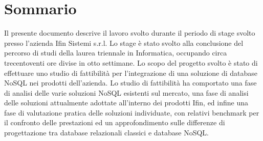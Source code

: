 
\cleardoublepage
{}
{}
\begingroup
\let\clearpage\relax
\let\cleardoublepage\relax
\let\cleardoublepage\relax

\chapter*{Sommario}

Il presente documento descrive il lavoro svolto durante il periodo di stage svolto presso l'azienda Ifin Sistemi s.r.l. Lo stage è stato svolto alla conclusione del percorso di studi della laurea triennale in Informatica, occupando circa trecentoventi ore divise in otto settimane.
Lo scopo del progetto svolto è stato di effettuare uno studio di fattibilità per l’integrazione di una soluzione di database NoSQL nei prodotti dell'azienda. Lo studio di fattibilità ha comportato una fase di analisi delle varie soluzioni NoSQL esistenti sul mercato, una fase di analisi delle soluzioni attualmente adottate all'interno dei prodotti Ifin, ed infine una fase di valutazione pratica delle soluzioni individuate, con relativi benchmark per il confronto delle prestazioni ed un approfondimento sulle differenze di progettazione tra database relazionali classici e database NoSQL.

%
%

\endgroup			

\vfill

